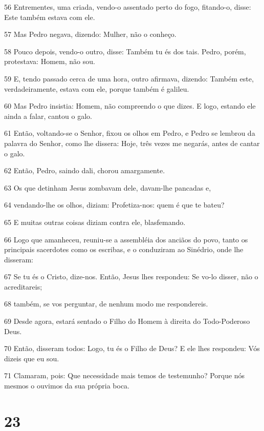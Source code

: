 \par 56 Entrementes, uma criada, vendo-o assentado perto do fogo, fitando-o, disse: Este também estava com ele.
\par 57 Mas Pedro negava, dizendo: Mulher, não o conheço.
\par 58 Pouco depois, vendo-o outro, disse: Também tu és dos tais. Pedro, porém, protestava: Homem, não sou.
\par 59 E, tendo passado cerca de uma hora, outro afirmava, dizendo: Também este, verdadeiramente, estava com ele, porque também é galileu.
\par 60 Mas Pedro insistia: Homem, não compreendo o que dizes. E logo, estando ele ainda a falar, cantou o galo.
\par 61 Então, voltando-se o Senhor, fixou os olhos em Pedro, e Pedro se lembrou da palavra do Senhor, como lhe dissera: Hoje, três vezes me negarás, antes de cantar o galo.
\par 62 Então, Pedro, saindo dali, chorou amargamente.
\par 63 Os que detinham Jesus zombavam dele, davam-lhe pancadas e,
\par 64 vendando-lhe os olhos, diziam: Profetiza-nos: quem é que te bateu?
\par 65 E muitas outras coisas diziam contra ele, blasfemando.
\par 66 Logo que amanheceu, reuniu-se a assembléia dos anciãos do povo, tanto os principais sacerdotes como os escribas, e o conduziram ao Sinédrio, onde lhe disseram:
\par 67 Se tu és o Cristo, dize-nos. Então, Jesus lhes respondeu: Se vo-lo disser, não o acreditareis;
\par 68 também, se vos perguntar, de nenhum modo me respondereis.
\par 69 Desde agora, estará sentado o Filho do Homem à direita do Todo-Poderoso Deus.
\par 70 Então, disseram todos: Logo, tu és o Filho de Deus? E ele lhes respondeu: Vós dizeis que eu sou.
\par 71 Clamaram, pois: Que necessidade mais temos de testemunho? Porque nós mesmos o ouvimos da sua própria boca.

\chapter{23}

